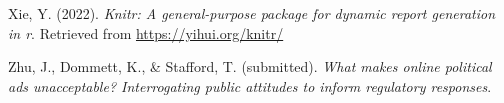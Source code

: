 \documentclass[
  ,jou,floatsintext]{apa6}
\newlength{\cslhangindent}
\newlength{\cslentryspacingunit} %
\newenvironment{CSLReferences}[2] %
 {%
  \setlength{\parindent}{0pt}
  \ifodd #1
  \let\oldpar\par
  \def\par{\hangindent=\cslhangindent\oldpar}
  \fi
  \setlength{\parskip}{#2\cslentryspacingunit}
 }%
 {}
\begin{document}
\begin{CSLReferences}{1}{0}
\leavevmode{}%
Xie, Y. (2022). \emph{Knitr: A general-purpose package for dynamic report generation in r}. Retrieved from \url{https://yihui.org/knitr/}

\leavevmode{}%
Zhu, J., Dommett, K., \& Stafford, T. (submitted). \emph{What makes online political ads unacceptable? Interrogating public attitudes to inform regulatory responses}.

\end{CSLReferences}
\end{document}
